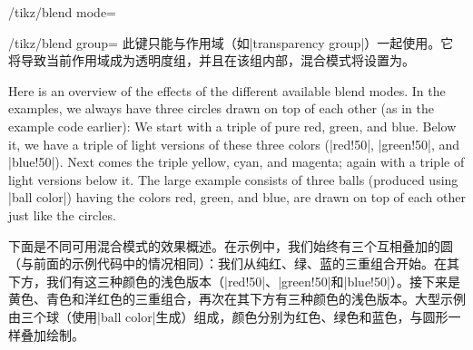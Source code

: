 \begin{key}{/tikz/blend mode=}
\begin{key}{/tikz/blend group=}
        此键只能与作用域（如|transparency group|）一起使用。它将导致当前作用域成为透明度组，并且在该组内部，混合模式将设置为。

\begin{codeexample}[]
\end{codeexample}
    \end{key}

    Here is an overview of the effects of the different available blend modes.
    In the examples, we always have three circles drawn on top of each other
    (as in the example code earlier): We start with a triple of pure red,
    green, and blue. Below it, we have a triple of light versions of these
    three colors (|red!50|, |green!50|, and |blue!50|). Next comes the triple
    yellow, cyan, and magenta; again with a triple of light versions below it.
    The large example consists of three balls (produced using |ball color|)
    having the colors red, green, and blue, are drawn on top of each other just
    like the circles.

    下面是不同可用混合模式的效果概述。在示例中，我们始终有三个互相叠加的圆（与前面的示例代码中的情况相同）：我们从纯红、绿、蓝的三重组合开始。在其下方，我们有这三种颜色的浅色版本（|red!50|、|green!50|和|blue!50|）。接下来是黄色、青色和洋红色的三重组合，再次在其下方有三种颜色的浅色版本。大型示例由三个球（使用|ball color|生成）组成，颜色分别为红色、绿色和蓝色，与圆形一样叠加绘制。


    \def\makeline#1#2#3{\leavevmode
        \hbox to 40mm{#1\hss}\ \hbox to
        20.5mm{#2\hss}\ \begin{minipage}[t]{88.5mm}\raggedright#3\end{minipage}\par
        \textcolor{black!25}{\hrule height1pt}
    }


\end{key}

